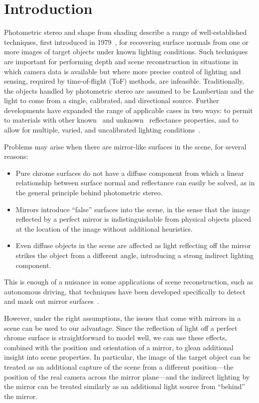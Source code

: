 \section{Introduction}\label{sec:introduction}
Photometric stereo and shape from shading describe a range of well-established
techniques, first introduced in 1979~\cite{woodham1979}, for recovering surface
normals from one or more images of target objects under known lighting
conditions. Such techniques are important for performing depth and scene
reconstruction in situations in which camera data is available but where more
precise control of lighting and sensing, required by time-of-flight (ToF)
methods, are infeasible. Traditionally, the objects handled by photometric
stereo are assumed to be Lambertian and the light to come from a single,
calibrated, and directional source. Further developments have expanded the
range of applicable cases in two ways: to permit to materials with other
known~\cite{defigueiredo} and unknown~\cite{hertzmann} reflectance properties,
and to allow for multiple, varied, and uncalibrated lighting
conditions~\cite{basri2001-12}.

Problems may arise when there are mirror-like surfaces in the scene, for
several reasons:
\begin{itemize}
  \item Pure chrome surfaces do not have a diffuse component from which a
  linear relationship between surface normal and reflectance can easily be
  solved, as in the general principle behind photometric stereo.
  \item Mirrors introduce ``false'' surfaces into the scene, in the sense that
  the image reflected by a perfect mirror is indistinguishable from physical
  objects placed at the location of the image without additional heuristics.
  \item Even diffuse objects in the scene are affected as light reflecting off
  the mirror strikes the object from a different angle, introducing a strong
  indirect lighting component.
\end{itemize}
This is enough of a nuisance in some applications of scene reconstruction, such
as autonomous driving, that techniques have been developed specifically to
detect and mask out mirror surfaces~\cite{yang}.

However, under the right assumptions, the issues that come with mirrors in a
scene can be used to our advantage. Since the reflection of light off a perfect
chrome surface is straightforward to model well, we can use these effects,
combined with the position and orientation of a mirror, to glean additional
insight into scene properties. In particular, the image of the target object
can be treated as an additional capture of the scene from a different
position---the position of the real camera across the mirror plane---and the
indirect lighting by the mirror can be treated similarly as an additional light
source from ``behind'' the mirror.

